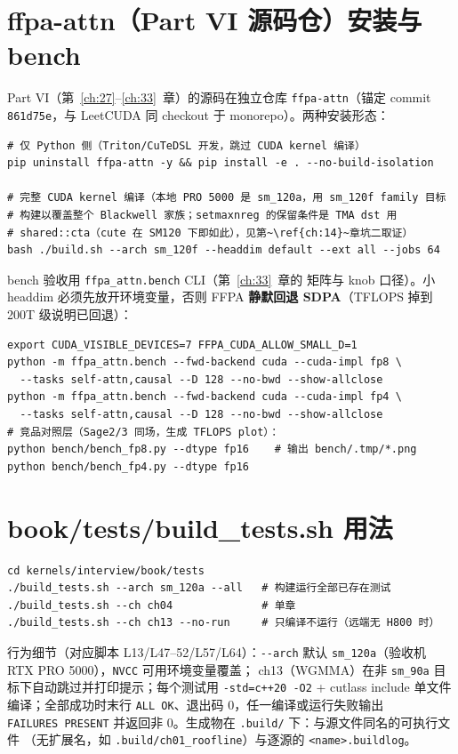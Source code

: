 \section{ffpa-attn（Part VI 源码仓）安装与 bench}

Part VI（第~\ref{ch:27}--\ref{ch:33}~章）的源码在独立仓库
\texttt{ffpa-attn}（锚定 commit \texttt{861d75e}，与 LeetCUDA 同 checkout
于 monorepo）。两种安装形态：

\begin{lstlisting}[style=console]
# 仅 Python 侧（Triton/CuTeDSL 开发，跳过 CUDA kernel 编译）
pip uninstall ffpa-attn -y && pip install -e . --no-build-isolation

# 完整 CUDA kernel 编译（本地 PRO 5000 是 sm_120a，用 sm_120f family 目标
# 构建以覆盖整个 Blackwell 家族；setmaxnreg 的保留条件是 TMA dst 用
# shared::cta（cute 在 SM120 下即如此），见第~\ref{ch:14}~章坑二取证）
bash ./build.sh --arch sm_120f --headdim default --ext all --jobs 64
\end{lstlisting}

\noindent bench 验收用 \texttt{ffpa\_attn.bench} CLI（第~\ref{ch:33}~章的
矩阵与 knob 口径）。小 headdim 必须先放开环境变量，否则 FFPA
\textbf{静默回退 SDPA}（TFLOPS 掉到 200T 级说明已回退）：

\begin{lstlisting}[style=console]
export CUDA_VISIBLE_DEVICES=7 FFPA_CUDA_ALLOW_SMALL_D=1
python -m ffpa_attn.bench --fwd-backend cuda --cuda-impl fp8 \
  --tasks self-attn,causal --D 128 --no-bwd --show-allclose
python -m ffpa_attn.bench --fwd-backend cuda --cuda-impl fp4 \
  --tasks self-attn,causal --D 128 --no-bwd --show-allclose
# 竞品对照层（Sage2/3 同场，生成 TFLOPS plot）：
python bench/bench_fp8.py --dtype fp16    # 输出 bench/.tmp/*.png
python bench/bench_fp4.py --dtype fp16
\end{lstlisting}

\section{book/tests/build\_tests.sh 用法}

\begin{lstlisting}[style=console]
cd kernels/interview/book/tests
./build_tests.sh --arch sm_120a --all   # 构建运行全部已存在测试
./build_tests.sh --ch ch04              # 单章
./build_tests.sh --ch ch13 --no-run     # 只编译不运行（远端无 H800 时）
\end{lstlisting}

行为细节（对应脚本 L13/L47--52/L57/L64）：\texttt{-{}-arch} 默认
\texttt{sm\_120a}（验收机 RTX PRO 5000），\texttt{NVCC} 可用环境变量覆盖；
ch13（WGMMA）在非 \texttt{sm\_90a} 目标下自动跳过并打印提示；每个测试用
\texttt{-std=c++20 -O2} + cutlass include 单文件编译；全部成功时末行
\texttt{ALL~OK}、退出码 0，任一编译或运行失败输出 \texttt{FAILURES~PRESENT}
并返回非 0。生成物在 \texttt{.build/} 下：与源文件同名的可执行文件
（无扩展名，如 \texttt{.\allowbreak{}build/\allowbreak{}ch01\_\allowbreak{}roofline}）与逐源的
\texttt{\allowbreak{}<name>.\allowbreak{}buildlog}。

